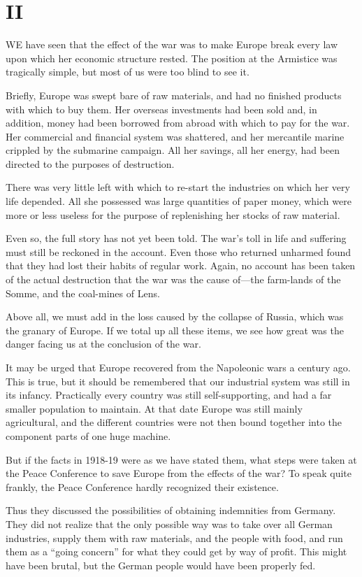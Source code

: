 \documentclass{book}
\begin{document}
\section*{II}
WE have seen that the effect of the war was to make Europe break every law upon which her economic structure rested. The position at the Armistice was tragically simple, but most of us were too blind to see it.

Briefly, Europe was swept bare of raw materials, and had no finished products with which to buy them. Her overseas investments had been sold and, in addition, money had been borrowed from abroad with which to pay for the war. Her commercial and financial system was shattered, and her mercantile marine crippled by the submarine campaign. All her savings, all her energy, had been directed to the purposes of destruction.

There was very little left with which to re-start the industries on which her very life depended. All she possessed was large quantities of paper money, which were more or less useless for the purpose of replenishing her stocks of raw material.

Even so, the full story has not yet been told. The war’s toll in life and suffering must still be reckoned in the account. Even those who returned unharmed found that they had lost their habits of regular work. Again, no account has been taken of the actual destruction that the war was the cause of—the farm-lands of the Somme, and the coal-mines of Lens.

Above all, we must add in the loss caused by the collapse of Russia, which was the granary of Europe. If we total up all these items, we see how great was the danger facing us at the conclusion of the war.

It may be urged that Europe recovered from the Napoleonic wars a century ago. This is true, but it should be remembered that our industrial system was still in its infancy. Practically every country was still self-supporting, and had a far smaller population to maintain. At that date Europe was still mainly agricultural, and the different countries were not then bound together into the component parts of one huge machine.

But if the facts in 1918-19 were as we have stated them, what steps were taken at the Peace Conference to save Europe from the effects of the war? To speak quite frankly, the Peace Conference hardly recognized their existence.

Thus they discussed the possibilities of obtaining indemnities from Germany. They did not realize that the only possible way was to take over all German industries, supply them with raw materials, and the people with food, and run them as a “going concern” for what they could get by way of profit. This might have been brutal, but the German people would have been properly fed.
\end{document}
